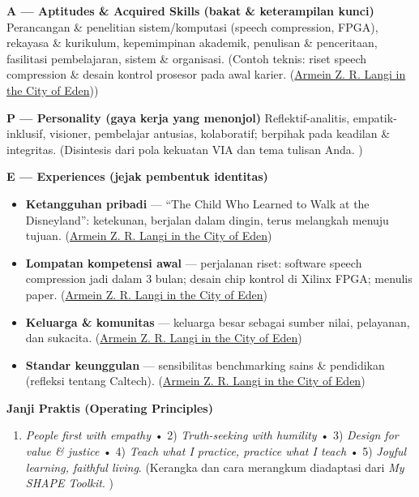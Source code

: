 \documentclass[
  letterpaper,
  DIV=11,
  numbers=noendperiod]{scrreprt}
\providecommand{\tightlist}{%
  \setlength{\itemsep}{0pt}\setlength{\parskip}{0pt}}
\begin{document}
\textbf{A --- Aptitudes \& Acquired Skills (bakat \& keterampilan
kunci)} Perancangan \& penelitian sistem/komputasi (speech compression,
FPGA), rekayasa \& kurikulum, kepemimpinan akademik, penulisan \&
penceritaan, fasilitasi pembelajaran, sistem \& organisasi. (Contoh
teknis: riset speech compression \& desain kontrol prosesor pada awal
karier.
(\href{https://ii-2100.github.io/all-about-me/My_Song_for_You/index.html}{Armein
Z. R. Langi in the City of Eden}))

\textbf{P --- Personality (gaya kerja yang menonjol)}
Reflektif-analitis, empatik-inklusif, visioner, pembelajar antusias,
kolaboratif; berpihak pada keadilan \& integritas. (Disintesis dari pola
kekuatan VIA dan tema tulisan Anda. )

\textbf{E --- Experiences (jejak pembentuk identitas)}

\begin{itemize}
\tightlist
\item
  \textbf{Ketangguhan pribadi} --- ``The Child Who Learned to Walk at
  the Disneyland'': ketekunan, berjalan dalam dingin, terus melangkah
  menuju tujuan.
  (\href{https://ii-2100.github.io/all-about-me/My_Stories_for_You/index.html}{Armein
  Z. R. Langi in the City of Eden})
\item
  \textbf{Lompatan kompetensi awal} --- perjalanan riset: software
  speech compression jadi dalam 3 bulan; desain chip kontrol di Xilinx
  FPGA; menulis paper.
  (\href{https://ii-2100.github.io/all-about-me/My_Song_for_You/index.html}{Armein
  Z. R. Langi in the City of Eden})
\item
  \textbf{Keluarga \& komunitas} --- keluarga besar sebagai sumber
  nilai, pelayanan, dan sukacita.
  (\href{https://ii-2100.github.io/all-about-me/My_Shapes/index.html}{Armein
  Z. R. Langi in the City of Eden})
\item
  \textbf{Standar keunggulan} --- sensibilitas benchmarking sains \&
  pendidikan (refleksi tentang Caltech).
  (\href{https://ii-2100.github.io/all-about-me/My_Personal_Reviews/index.html}{Armein
  Z. R. Langi in the City of Eden})
\end{itemize}

\textbf{Janji Praktis (Operating Principles)}

\begin{enumerate}
\def\labelenumi{\arabic{enumi}.}
\tightlist
\item
  \emph{People first with empathy} • 2) \emph{Truth-seeking with
  humility} • 3) \emph{Design for value \& justice} • 4) \emph{Teach
  what I practice, practice what I teach} • 5) \emph{Joyful learning,
  faithful living}. (Kerangka dan cara merangkum diadaptasi dari
  \emph{My SHAPE Toolkit}. )
\end{enumerate}
\end{document}
